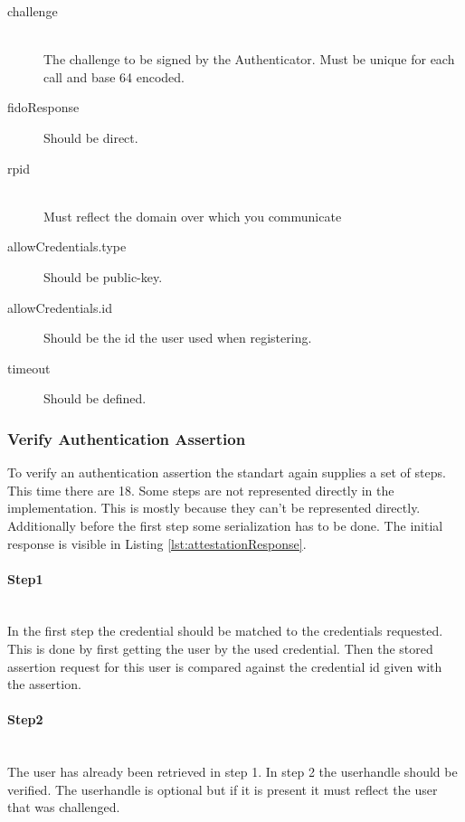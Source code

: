 \documentclass[a4paper, 11pt]{scrartcl}
\begin{document}
\begin{description}
  \item[challenge] \hfill \\ The challenge to be signed by the Authenticator. Must be unique for each call and base 64 encoded.
  \item[fidoResponse] Should be direct. 
  \item[rpid] \hfill \\ Must reflect the domain over which you communicate
  \item[allowCredentials.type] Should be public-key. 
  \item[allowCredentials.id] Should be the id the user used when registering.
  \item[timeout] Should be defined.   
\end{description}

\subsubsection{Verify Authentication Assertion}

To verify an authentication assertion the standart again supplies a set of steps. This time there are 18. Some steps are not represented directly in the implementation. This is mostly because they can't be represented directly. Additionally before the first step some serialization has to be done. The initial response is visible in Listing \ref{lst:attestationResponse}.



\paragraph{Step1}\hfill \\ 
In the first step the credential should be matched to the credentials requested. This is done by first getting the user by the used credential. Then the stored assertion request for this user is compared against the credential id given with the assertion.

\paragraph{Step2}\hfill \\ 
The user has already been retrieved in step 1. In step 2 the userhandle should be verified. The userhandle is optional but if it is present it must reflect the user that was challenged.
\end{document}
